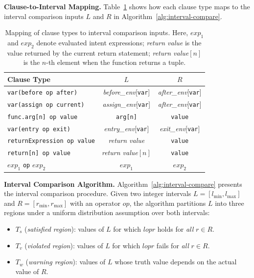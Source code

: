\documentclass[pdflatex,sn-basic]{sn-jnl}%
\theoremstyle{thmstyleone}%
\theoremstyle{thmstyletwo}%
\theoremstyle{thmstylethree}%
\begin{document}
\smallskip
\noindent\textbf{Clause-to-Interval Mapping.}
Table~\ref{tab:interval-mapping} shows how each clause type maps to the interval comparison inputs $L$ and $R$ in Algorithm~\ref{alg:interval-compare}.

\begin{table}[t]
\centering
\caption{Mapping of clause types to interval comparison inputs. Here, $\mathit{exp}_1$ and $\mathit{exp}_2$ denote evaluated intent expressions; \textit{return value} is the value returned by the current return statement; \textit{return value}$[n]$ is the $n$-th element when the function returns a tuple.}
\label{tab:interval-mapping}
\small
\begin{tabular*}{\linewidth}{@{\extracolsep{\fill}}lcc}
\toprule
Clause Type & $L$ & $R$ \\
\midrule
\texttt{var(before op after)} & \textit{before\_env}[\texttt{var}] & \textit{after\_env}[\texttt{var}] \\
\texttt{var(assign op current)} & \textit{assign\_env}[\texttt{var}] & \textit{after\_env}[\texttt{var}] \\
\texttt{func.arg[n] op value} & \texttt{arg[n]} & \texttt{value} \\
\midrule
\texttt{var(entry op exit)} & \textit{entry\_env}[\texttt{var}] & \textit{exit\_env}[\texttt{var}] \\
\midrule
\texttt{returnExpression op value} & \textit{return value} & \texttt{value} \\
\texttt{return[n] op value} & \textit{return value}$[n]$ & \texttt{value} \\
$\mathit{exp}_1$ \texttt{op} $\mathit{exp}_2$ & $\mathit{exp}_1$ & $\mathit{exp}_2$ \\
\bottomrule
\end{tabular*}
\end{table}

\smallskip
\noindent\textbf{Interval Comparison Algorithm.}
Algorithm~\ref{alg:interval-compare} presents the interval comparison procedure.
Given two integer intervals $L = [l_{\min}, l_{\max}]$ and $R = [r_{\min}, r_{\max}]$ with an operator $op$, the algorithm partitions $L$ into three regions under a uniform distribution assumption over both intervals:
\begin{itemize}
    \item $T_s$ (\textit{satisfied region}): values of $L$ for which $l \mathrel{op} r$ holds for \emph{all} $r \in R$.
    \item $T_v$ (\textit{violated region}): values of $L$ for which $l \mathrel{op} r$ fails for \emph{all} $r \in R$.
    \item $T_w$ (\textit{warning region}): values of $L$ whose truth value depends on the actual value of $R$.
\end{itemize}
\end{document}
